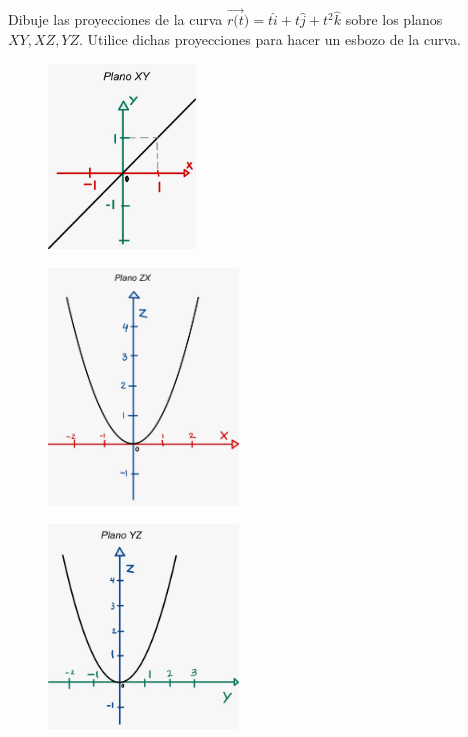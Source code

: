 \documentclass[12pt]{article}
\begin{document}
\section{}
Dibuje las proyecciones de la curva $\vec{r(t})=t\hat{i}+t\hat{j}+t^2\hat{k}$ sobre los planos $XY , XZ, YZ$. Utilice dichas proyecciones para hacer un esbozo de la curva.
  \begin{figure}[H]
    \centering
    \includegraphics[width=0.35\textwidth]{./img/t2_ej5_xy.jpeg}
  \end{figure}
  \begin{figure}[H]
    \centering
    \includegraphics[width=0.45\textwidth]{./img/t2_ej5_zx.jpeg}
  \end{figure}
  \begin{figure}[H]
    \centering
    \includegraphics[width=0.45\textwidth]{./img/t2_ej5_yz.jpeg}
  \end{figure}
\end{document}
